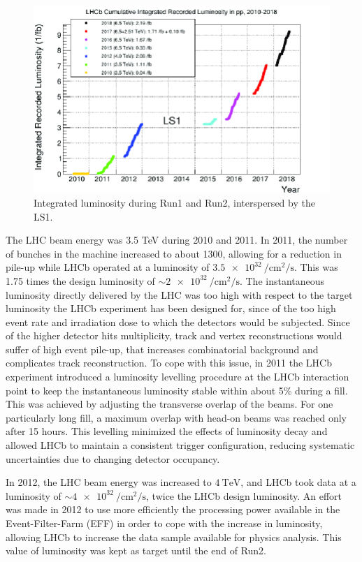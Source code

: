\begin{figure}
    \centering
    \includegraphics[width=\textwidth]{figures/lumiRun2.png}
    \caption{Integrated luminosity during Run1 and Run2, interspersed by the LS1.}
    \label{fig:lumiRun1Run2}
\end{figure}

The LHC beam energy was 3.5 TeV during 2010 and 2011. In 2011, the number of bunches in the machine increased to about 1300, allowing for a reduction in pile-up while LHCb operated at a luminosity of $\SI{3.5e32}{\per\centi\meter\squared\per\second}$. This was 1.75 times the design luminosity of $\sim \SI{2e32}{\per\centi\meter\squared\per\second}$. The instantaneous luminosity directly delivered by the LHC was too high with respect to the target luminosity the LHCb experiment has been designed for, since of the too high event rate and irradiation dose to which the detectors would be subjected. Since of the higher detector hits multiplicity, track and vertex reconstructions would suffer of high event pile-up, that increases combinatorial background and complicates track reconstruction.
To cope with this issue, in 2011 the LHCb experiment introduced a luminosity levelling procedure at the LHCb interaction point to keep the instantaneous luminosity stable within about 5\% during a fill. This was achieved by adjusting the transverse overlap of the beams. For one particularly long fill, a maximum overlap with head-on beams was reached only after 15 hours. This levelling minimized the effects of luminosity decay and allowed LHCb to maintain a consistent trigger configuration, reducing systematic uncertainties due to changing detector occupancy.

In 2012, the LHC beam energy was increased to $\SI{4}{\tera\eV}$, and LHCb took data at a luminosity of $\sim \SI{4e32}{\per\centi\meter\squared\per\second}$, twice the LHCb design luminosity. An effort was made in 2012 to use more efficiently the processing power available in the Event-Filter-Farm (EFF) in order to cope with the increase in luminosity, allowing LHCb to increase the data sample available for physics analysis. This value of luminosity was kept as target until the end of Run2. 


